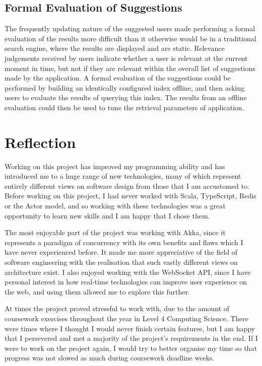 \documentclass{l4proj}
\begin{document}
        \subsection{Formal Evaluation of Suggestions}
    The frequently updating nature of the suggested users made performing a formal evaluation of the results more difficult than it otherwise would be in a traditional search engine, where the results are displayed and are static. Relevance judgements received by users indicate whether a user is relevant at the current moment in time, but not if they are relevant within the overall list of suggestions made by the application. A formal evaluation of the suggestions could be performed by building an identically configured index offline, and then asking users to evaluate the results of querying this index. The results from an offline evaluation could then be used to tune the retrieval parameters of application.
    
    \section{Reflection}
    Working on this project has improved my programming ability and has introduced me to a huge range of new technologies, many of which represent entirely different views on software design from those that I am accustomed to. Before working on this project, I had never worked with Scala, TypeScript, Redis or the Actor model, and so working with these technologies was a great opportunity to learn new skills and I am happy that I chose them.
    
    The most enjoyable part of the project was working with Akka, since it represents a paradigm of concurrency with its own benefits and flaws which I have never experienced before. It made me more appreciative of the field of software engineering with the realisation that such vastly different views on architecture exist. I also enjoyed working with the WebSocket API, since I have personal interest in how real-time technologies can improve user experience on the web, and using them allowed me to explore this further.
    
    At times the project proved stressful to work with, due to the amount of coursework exercises throughout the year in Level 4 Computing Science. There were times where I thought I would never finish certain features, but I am happy that I persevered and met a majority of the project's requirements in the end. If I were to work on the project again, I would try to better organise my time so that progress was not slowed as much during coursework deadline weeks.
\end{document}
